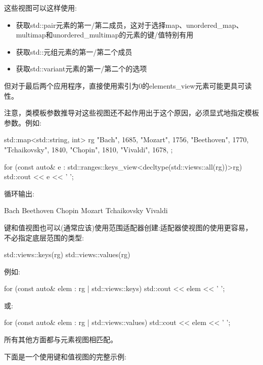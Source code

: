这些视图可以这样使用:

\begin{itemize}
\item
获取std::pair元素的第一/第二成员，这对于选择map、unordered\_map、multimap和unordered\_multimap的元素的键/值特别有用

\item
获取std::元组元素的第一/第二个成员

\item
获取std::variant元素的第一/第二个的选项
\end{itemize}

但对于最后两个应用程序，直接使用索引为0的elements\_view元素可能更具可读性。

注意，类模板参数推导对这些视图还不起作用出于这个原因，必须显式地指定模板参数。例如:

\begin{cpp}
std::map<std::string, int> rg{
	{"Bach", 1685}, {"Mozart", 1756}, {"Beethoven", 1770},
	{"Tchaikovsky", 1840}, {"Chopin", 1810}, {"Vivaldi", 1678},
};

for (const auto& e : std::ranges::keys_view<decltype(std::views::all(rg))>{rg}) {
	std::cout << e << ' ';
}
\end{cpp}

循环输出:

\begin{shell}
Bach Beethoven Chopin Mozart Tchaikovsky Vivaldi
\end{shell}


键和值视图也可以(通常应该)使用范围适配器创建:适配器使视图的使用更容易，不必指定底层范围的类型:

\begin{cpp}
std::views::keys(rg)
std::views::values(rg)
\end{cpp}

例如:

\begin{cpp}
for (const auto& elem : rg | std::views::keys) {
	std::cout << elem << ' ';
}
\end{cpp}

或:

\begin{cpp}
for (const auto& elem : rg | std::views::values) {
	std::cout << elem << ' ';
}
\end{cpp}

所有其他方面都与元素视图相匹配。

下面是一个使用键和值视图的完整示例:

